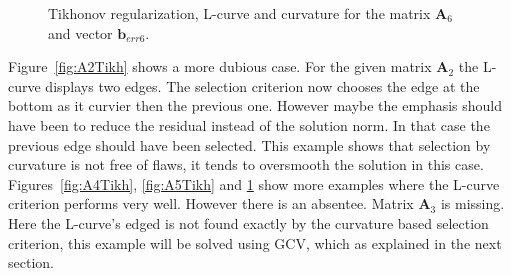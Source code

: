 \begin{figure}


\caption{Tikhonov regularization, L-curve and curvature for the matrix $\mathbf{A}_{6}$ and vector $\mathbf{b}_{err6}$.}
\label{fig:A6Tikh}
\end{figure}
Figure~\ref{fig:A2Tikh} shows a more dubious case. For the given matrix $\mathbf{A}_2$ the L-curve displays two edges. The selection criterion now chooses the edge at the bottom as it curvier then the previous one. However maybe the emphasis should have been to reduce the residual instead of the solution norm. In that case the previous edge should have been selected. This example shows that selection by curvature is not free of flaws, it tends to oversmooth the solution in this case. Figures~\ref{fig:A4Tikh}, \ref{fig:A5Tikh} and \ref{fig:A6Tikh} show more examples where the L-curve criterion performs very well. However there is an absentee. Matrix $\mathbf{A}_{3}$ is missing. Here the L-curve's edged is not found exactly by the curvature based selection criterion, this example will be solved using GCV, which as explained in the next section.


